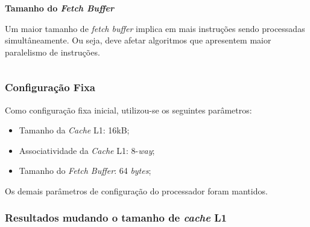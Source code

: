 \documentclass{beamer}
\begin{document}
\begin{frame}
\begin{columns}
\begin{column}{0.3\textwidth}
\begin{center}
                    \Large
                    \textbf{Tamanho do \textit{Fetch Buffer}}
                \end{center}

                \justifying
                \footnotesize
                Um maior tamanho de \textit{fetch buffer} implica em mais instruções sendo processadas simultâneamente. Ou seja,
                deve afetar algoritmos que apresentem maior paralelismo de instruções.

            \end{column}
        \end{columns}

    \end{frame}

    \begin{frame}
        \frametitle{Configuração Fixa}

        \LARGE
        Como configuração fixa inicial, utilizou-se os seguintes parâmetros:

        \begin{itemize}
            \item Tamanho da \textit{Cache} L1: 16kB;
            \item Associatividade da \textit{Cache} L1: 8-\textit{way};
            \item Tamanho do \textit{Fetch Buffer}: 64 \textit{bytes};
        \end{itemize}
        Os demais parâmetros de configuração do processador foram mantidos.

    \end{frame}

    \begin{frame}
        \frametitle{Resultados mudando o tamanho de \textit{cache} L1}

        \begin{figure}[h]
            \centering
        \end{figure}

    \end{frame}
\end{document}
